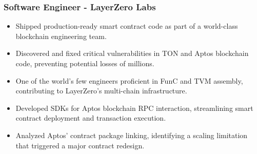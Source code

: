 \documentclass[10pt,letterpaper]{article}
\begin{document}
\begin{minipage}[t]{0.47\textwidth}
\subsubsection*{\textbf{Software Engineer} - LayerZero Labs}
\label{sec:orged9d799}
\begin{itemize}
\item Shipped production-ready smart contract code as part of a world-class blockchain engineering team.
\item Discovered and fixed critical vulnerabilities in TON and Aptos blockchain code, preventing potential losses of millions.
\item One of the world's few engineers proficient in FunC and TVM assembly, contributing to LayerZero’s multi-chain infrastructure.
\item Developed SDKs for Aptos blockchain RPC interaction, streamlining smart contract deployment and transaction execution.
\item Analyzed Aptos’ contract package linking, identifying a scaling limitation that triggered a major contract redesign.
\end{itemize}

\end{minipage}
\hfill
\end{document}
